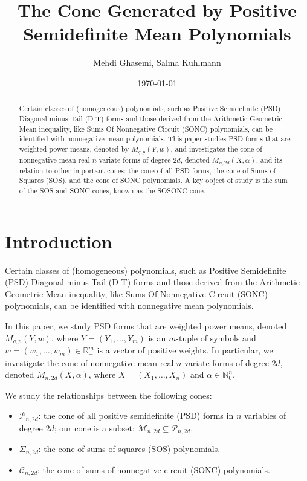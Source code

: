 \documentclass{article}
\title{The Cone Generated by Positive Semidefinite Mean Polynomials}
\author{Mehdi Ghasemi, Salma Kuhlmann}
\date{\today}
\begin{document}
\maketitle

\begin{abstract}
Certain classes of (homogeneous) polynomials, such as Positive Semidefinite (PSD) Diagonal minus Tail (D-T)
forms and those derived from the Arithmetic-Geometric Mean inequality, like Sums Of Nonnegative Circuit (SONC)
polynomials, can be identified with nonnegative mean polynomials. This paper studies PSD forms that are weighted
power means, denoted by $M_{q,p}(Y, w)$, and investigates the cone of nonnegative mean real $n$-variate forms
of degree $2d$, denoted $M_{n,2d}(X, \alpha)$, and its relation to other important cones: the cone of all PSD
forms, the cone of Sums of Squares (SOS), and the cone of SONC polynomials. A key object of study is the sum
of the SOS and SONC cones, known as the SOSONC cone.
\end{abstract}

\section{Introduction}\label{s00}

Certain classes of (homogeneous) polynomials, such as Positive Semidefinite (PSD) Diagonal minus Tail (D-T) forms and
those derived from the Arithmetic-Geometric Mean inequality, like Sums Of Nonnegative Circuit (SONC) polynomials, can
be identified with nonnegative mean polynomials.

In this paper, we study PSD forms that are weighted power means, denoted $M_{q,p}(Y, w)$, where $Y = (Y_1, \dots, Y_m)$
is an $m$-tuple of symbols and $w = (w_1, \dots, w_m) \in \mathbb{R}_+^m$ is a vector of positive weights. In particular,
we investigate the cone of nonnegative mean real $n$-variate forms of degree $2d$, denoted $M_{n,2d}(X, \alpha)$, where
$X = (X_1, \dots, X_n)$ and $\alpha \in \mathbb{N}_0^n$.

We study the relationships between the following cones:
\begin{itemize}
   \item $\mathcal{P}_{n,2d}$: the cone of all positive semidefinite (PSD) forms in $n$ variables of degree $2d$; our cone
   is a subset: $\mathcal{M}_{n,2d} \subseteq \mathcal{P}_{n,2d}$.
   \item $\Sigma_{n,2d}$: the cone of sums of squares (SOS) polynomials.
   \item $\mathcal{C}_{n,2d}$: the cone of sums of nonnegative circuit (SONC) polynomials.
\end{itemize}
\end{document}
